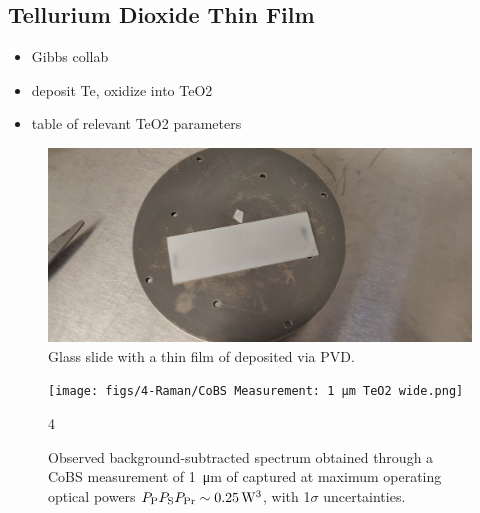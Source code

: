 \subsection{Tellurium Dioxide Thin Film}
\label{subsec:Raman:Target:TeO2}

\begin{itemize}
  \item Gibbs collab
  \item deposit Te, oxidize into TeO2
  \item table of relevant TeO2 parameters
\end{itemize}


\begin{figure}[t]
  \centering
  \includegraphics[width=.85\textwidth]{figs/4-Raman/slide-with-TeO2-film-on-substrate.jpeg}
  \caption{Glass slide with a thin film of  deposited via \ac{PVD}.}
  \label{fig:Raman:TeO2slide}
\end{figure}

\begin{figure}[t]
  \centering
  \hspace{-2em}\texttt{[image: figs/4-Raman/CoBS Measurement: 1 μm TeO2 wide.png]}
  \caption{Observed background-subtracted spectrum obtained through a \ac{CoBS} measurement of \SI{1}{\micro\meter} of  captured at maximum operating optical powers \(P_{\rm P}P_{\rm S}P_{\rm Pr} \sim \SI{0.25}{\cubic\watt}\), with 1\(\sigma\) uncertainties.}4
  \label{fig:Raman:1umTeO2}
\end{figure}

